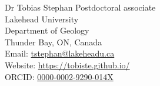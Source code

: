 \documentclass[10pt, paper=letter]{scrartcl} %
\begin{document}

\begin{cv}{\textcolor{myred}{\textsf{Dr Tobias Stephan}}}
    \medskip
    \noindent  Postdoctoral associate\smallskip \\
    Lakehead University\\
    Department of Geology\\
    Thunder Bay, ON, Canada\smallskip \\
    \noindent Email: \href{mailto:tstephan@lakeheadu.ca}{tstephan@lakeheadu.ca}\\
    Website: \url{https://tobiste.github.io/}\\
    ORCID: \href{https://orcid.org/0000-0002-9290-014X}{0000-0002-9290-014X}




\end{cv}
\end{document}
